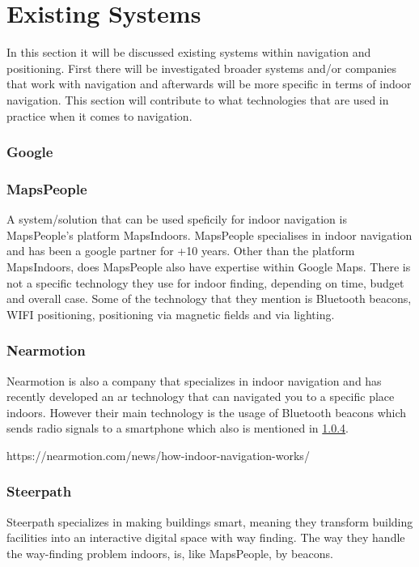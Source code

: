\section{Existing Systems}
In this section it will be discussed existing systems within navigation and positioning. First there will be investigated broader systems and/or companies that work with navigation and afterwards will be more specific in terms of indoor navigation. This section will contribute to what technologies that are used in practice when it comes to navigation. 

\subsubsection{Google}

\subsubsection{MapsPeople} %
A system/solution that can be used speficily for indoor navigation is MapsPeople's platform MapsIndoors. MapsPeople specialises in indoor navigation and has been a google partner for +10 years. Other than the platform MapsIndoors, does MapsPeople also have expertise within Google Maps. 
There is not a specific technology they use for indoor finding, depending on time, budget and overall case. Some of the technology that they mention is Bluetooth beacons, WIFI positioning, positioning via magnetic fields and via lighting. \cite{mapsppl}

\subsubsection{Nearmotion} %
Nearmotion is also a company that specializes in indoor navigation and has recently developed an \gls{ar} technology that can navigated you to a specific place indoors. However their main technology is the usage of Bluetooth beacons which sends radio signals to a smartphone which also is mentioned in \ref{}. \cite{nearmotion}

https://nearmotion.com/news/how-indoor-navigation-works/

\subsubsection{Steerpath} %
Steerpath specializes in making buildings smart, meaning they transform building facilities into an interactive digital space with way finding. The way they handle the way-finding problem indoors, is, like MapsPeople, by beacons. 

